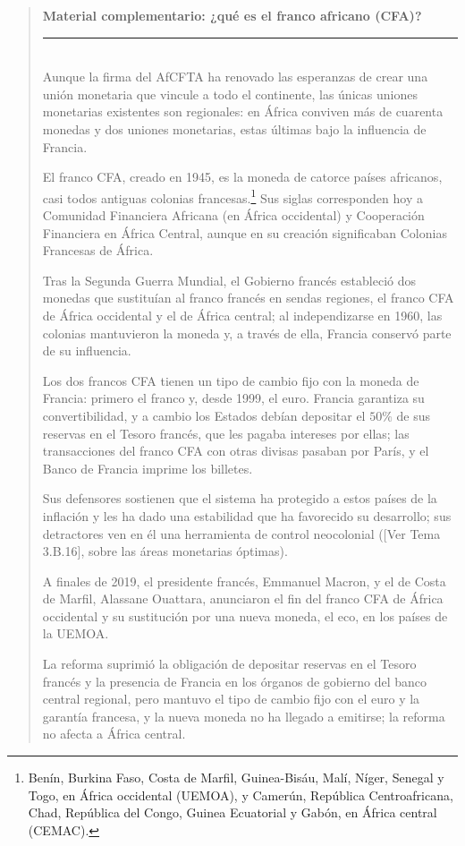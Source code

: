\documentclass[10pt,a4paper]{article}
\newenvironment{specialblock}[1]{%
      \begin{quote} %
      \small %
      \noindent\textbf{#1}\\[-0.3em] %
      \rule{\linewidth}{0.4pt}\\[0.6em]}{
      \end{quote}}
\newcommand{\authorfont}[1]{{\fontfamily{EBGaramond-TLF}\selectfont #1}}
\begin{document}
\begin{specialblock}{\textbf{Material complementario:} ¿qué es el franco africano (CFA)?}
    Aunque la firma del AfCFTA ha renovado las esperanzas de crear una unión monetaria que vincule a todo el continente, las únicas uniones monetarias existentes son regionales: en África conviven más de cuarenta monedas y dos uniones monetarias, estas últimas bajo la influencia de Francia. 
    
    El franco CFA, creado en 1945, es la moneda de catorce países africanos, casi todos antiguas colonias francesas.\footnote{%
        Benín, Burkina Faso, Costa de Marfil, Guinea-Bisáu, Malí, Níger, Senegal y Togo, en África occidental (UEMOA), y Camerún, República Centroafricana, Chad, República del Congo, Guinea Ecuatorial y Gabón, en África central (CEMAC).
    } Sus siglas corresponden hoy a Comunidad Financiera Africana (en África occidental) y Cooperación Financiera en África Central, aunque en su creación significaban Colonias Francesas de África. 
    
    Tras la Segunda Guerra Mundial, el Gobierno francés estableció dos monedas que sustituían al franco francés en sendas regiones, el franco CFA de África occidental y el de África central; al independizarse en 1960, las colonias mantuvieron la moneda y, a través de ella, Francia conservó parte de su influencia.

    Los dos francos CFA tienen un tipo de cambio fijo con la moneda de Francia: primero el franco y, desde 1999, el euro. Francia garantiza su convertibilidad, y a cambio los Estados debían depositar el $50\%$ de sus reservas en el Tesoro francés, que les pagaba intereses por ellas; las transacciones del franco CFA con otras divisas pasaban por París, y el Banco de Francia imprime los billetes. 
    
    Sus defensores sostienen que el sistema ha protegido a estos países de la inflación y les ha dado una estabilidad que ha favorecido su desarrollo; sus detractores ven en él una herramienta de control neocolonial ([\authorfont{Ver Tema 3.B.16}], sobre las áreas monetarias óptimas).

    A finales de 2019, el presidente francés, Emmanuel Macron, y el de Costa de Marfil, Alassane Ouattara, anunciaron el fin del franco CFA de África occidental y su sustitución por una nueva moneda, el eco, en los países de la UEMOA. 
    
    La reforma suprimió la obligación de depositar reservas en el Tesoro francés y la presencia de Francia en los órganos de gobierno del banco central regional, pero mantuvo el tipo de cambio fijo con el euro y la garantía francesa, y la nueva moneda no ha llegado a emitirse; la reforma no afecta a África central. 
    

\end{specialblock}
\end{document}
